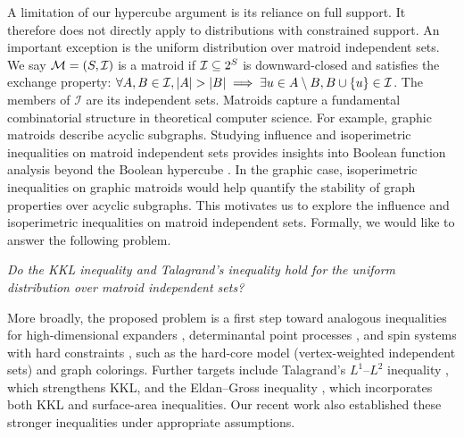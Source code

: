 A limitation of our hypercube argument is its reliance on full support.
It therefore does not directly apply to distributions with constrained support.
An important exception is the uniform distribution over matroid independent sets.
We say $\mathcal{M}=(S,\mathcal{I})$ is a matroid if $\mathcal{I}\subseteq 2^S$ is downward-closed and satisfies the exchange property: $\forall A,B\in \+I, |A|>|B|\implies \exists u\in A\setminus B, B\cup\{u\}\in\+I$.
The members of $\mathcal{I}$ are its independent sets.
Matroids capture a fundamental combinatorial structure in theoretical computer science.
For example, graphic matroids describe acyclic subgraphs.
Studying influence and isoperimetric inequalities on matroid independent sets provides insights into Boolean function analysis beyond the Boolean hypercube \cite{Hop26}.
In the graphic case, isoperimetric inequalities on graphic matroids would help quantify the stability of graph properties over acyclic subgraphs.
This motivates us to explore the influence and isoperimetric inequalities on matroid independent sets.
Formally, we would like to answer the following problem.
\begin{prob}\emph{
    Do the KKL inequality and Talagrand's inequality hold for the uniform distribution over matroid independent sets?
}\end{prob}
More broadly, the proposed problem is a first step toward analogous inequalities for high-dimensional expanders \cite{gotlib2023no}, determinantal point processes \cite{taskar2013determinantal}, and spin systems with hard constraints \cite{chen2023spectral}, such as the hard-core model (vertex-weighted independent sets) and graph colorings.
Further targets include Talagrand's $L^1$--$L^2$ inequality \cite{Talagrand94}, which strengthens KKL, and the Eldan--Gross inequality \cite{EldanGross22}, which incorporates both KKL and surface-area inequalities.
Our recent work \cite{chen2026discrete} also established these stronger inequalities under appropriate assumptions.